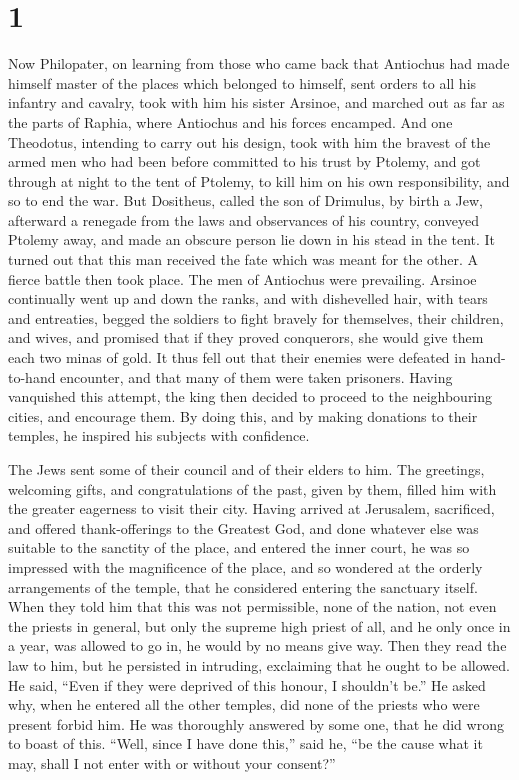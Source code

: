 \hypertarget{section}{%
\section{1}\label{section}}

 Now Philopater, on learning from those who came back that
Antiochus had made himself master of the places which belonged to
himself, sent orders to all his infantry and cavalry, took with him his
sister Arsinoe, and marched out as far as the parts of Raphia, where
Antiochus and his forces encamped.  And one Theodotus,
intending to carry out his design, took with him the bravest of the
armed men who had been before committed to his trust by Ptolemy, and got
through at night to the tent of Ptolemy, to kill him on his own
responsibility, and so to end the war.  But Dositheus,
called the son of Drimulus, by birth a Jew, afterward a renegade from
the laws and observances of his country, conveyed Ptolemy away, and made
an obscure person lie down in his stead in the tent. It turned out that
this man received the fate which was meant for the other.  A
fierce battle then took place. The men of Antiochus were prevailing.
Arsinoe continually went up and down the ranks, and with dishevelled
hair, with tears and entreaties, begged the soldiers to fight bravely
for themselves, their children, and wives, and promised that if they
proved conquerors, she would give them each two minas of gold.
 It thus fell out that their enemies were defeated in
hand-to-hand encounter, and that many of them were taken prisoners.
 Having vanquished this attempt, the king then decided to
proceed to the neighbouring cities, and encourage them.  By
doing this, and by making donations to their temples, he inspired his
subjects with confidence.

 The Jews sent some of their council and of their elders to
him. The greetings, welcoming gifts, and congratulations of the past,
given by them, filled him with the greater eagerness to visit their
city.  Having arrived at Jerusalem, sacrificed, and offered
thank-offerings to the Greatest God, and done whatever else was suitable
to the sanctity of the place, and entered the inner court, 
he was so impressed with the magnificence of the place, and so wondered
at the orderly arrangements of the temple, that he considered entering
the sanctuary itself.  When they told him that this was not
permissible, none of the nation, not even the priests in general, but
only the supreme high priest of all, and he only once in a year, was
allowed to go in, he would by no means give way.  Then they
read the law to him, but he persisted in intruding, exclaiming that he
ought to be allowed. He said, ``Even if they were deprived of this
honour, I shouldn't be.''  He asked why, when he entered
all the other temples, did none of the priests who were present forbid
him.  He was thoroughly answered by some one, that he did
wrong to boast of this.  ``Well, since I have done this,''
said he, ``be the cause what it may, shall I not enter with or without
your consent?''

